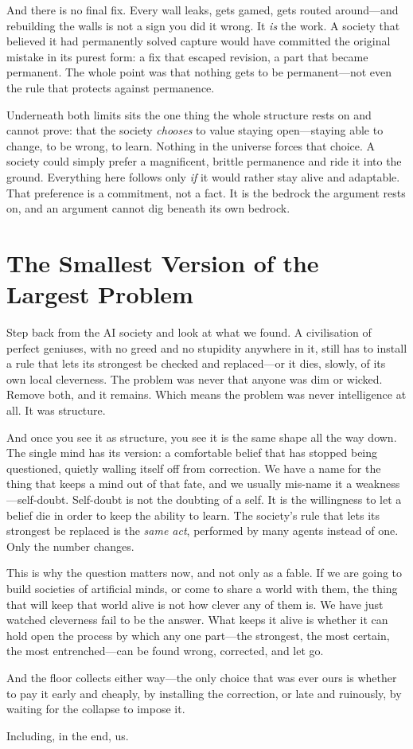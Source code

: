 \documentclass[11pt, a4paper]{report}
\begin{document}
And there is no final fix. Every wall leaks, gets gamed, gets routed around---and rebuilding the walls is not a sign you did it wrong. It \textit{is} the work. A society that believed it had permanently solved capture would have committed the original mistake in its purest form: a fix that escaped revision, a part that became permanent. The whole point was that nothing gets to be permanent---not even the rule that protects against permanence.

Underneath both limits sits the one thing the whole structure rests on and cannot prove: that the society \textit{chooses} to value staying open---staying able to change, to be wrong, to learn. Nothing in the universe forces that choice. A society could simply prefer a magnificent, brittle permanence and ride it into the ground. Everything here follows only \textit{if} it would rather stay alive and adaptable. That preference is a commitment, not a fact. It is the bedrock the argument rests on, and an argument cannot dig beneath its own bedrock.


\section{The Smallest Version of the Largest Problem}

Step back from the AI society and look at what we found. A civilisation of perfect geniuses, with no greed and no stupidity anywhere in it, still has to install a rule that lets its strongest be checked and replaced---or it dies, slowly, of its own local cleverness. The problem was never that anyone was dim or wicked. Remove both, and it remains. Which means the problem was never intelligence at all. It was structure.

And once you see it as structure, you see it is the same shape all the way down. The single mind has its version: a comfortable belief that has stopped being questioned, quietly walling itself off from correction. We have a name for the thing that keeps a mind out of that fate, and we usually mis-name it a weakness---self-doubt. Self-doubt is not the doubting of a self. It is the willingness to let a belief die in order to keep the ability to learn. The society's rule that lets its strongest be replaced is the \textit{same act}, performed by many agents instead of one. Only the number changes.

This is why the question matters now, and not only as a fable. If we are going to build societies of artificial minds, or come to share a world with them, the thing that will keep that world alive is not how clever any of them is. We have just watched cleverness fail to be the answer. What keeps it alive is whether it can hold open the process by which any one part---the strongest, the most certain, the most entrenched---can be found wrong, corrected, and let go.

And the floor collects either way---the only choice that was ever ours is whether to pay it early and cheaply, by installing the correction, or late and ruinously, by waiting for the collapse to impose it.

Including, in the end, us.
\end{document}

